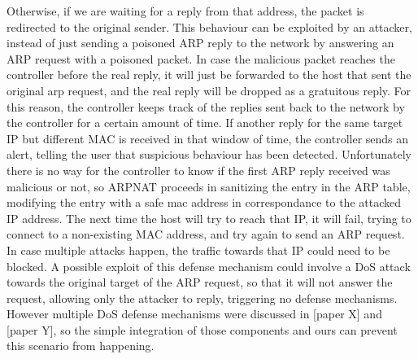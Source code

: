 \documentclass[11pt]{article}
\begin{document}
\begin{enumerate}
Otherwise, if we are waiting for a reply from that address, the packet is redirected to the original sender.
This behaviour can be exploited by an attacker, instead of just sending a poisoned ARP reply to the network by answering an ARP request with a poisoned packet. In case the malicious packet reaches the controller before the real reply, it will just be forwarded to the host that sent the original arp request, and the real reply will be dropped as a gratuitous reply.
For this reason, the controller keeps track of the replies sent back to the network by the controller for a certain amount of time. If another reply for the same target IP but different MAC is received in that window of time, the controller sends an alert, telling the user that suspicious behaviour has been detected. Unfortunately there is no way for the controller to know if the first ARP reply received was malicious or not, so ARPNAT proceeds in sanitizing the entry in the ARP table, modifying the entry with a safe mac address in correspondance to the attacked IP address.
The next time the host will try to reach that IP, it will fail, trying to connect to a non-existing MAC address, and try again to send an ARP request. In case multiple attacks happen, the traffic towards that IP could need to be blocked.
A possible exploit of this defense mechanism could involve a DoS attack towards the original target of the ARP request, so that it will not answer the request, allowing only the attacker to reply, triggering no defense mechanisms. However multiple DoS defense mechanisms were discussed in [paper X] and [paper Y], so the simple integration of those components and ours can prevent this scenario from happening.
\end{enumerate}
\end{document}
